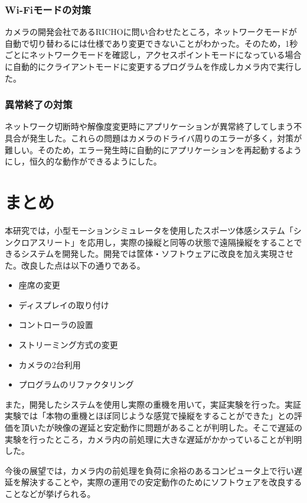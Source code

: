 \documentclass[a4paper,12pt]{jsarticle}
\begin{document}
\subsubsection{Wi-Fiモードの対策}
カメラの開発会社であるRICHOに問い合わせたところ，ネットワークモードが自動で切り替わるには仕様であり変更できないことがわかった。そのため，1秒ごとにネットワークモードを確認し，アクセスポイントモードになっている場合に自動的にクライアントモードに変更するプログラムを作成しカメラ内で実行した。

\subsubsection{異常終了の対策}
ネットワーク切断時や解像度変更時にアプリケーションが異常終了してしまう不具合が発生した。これらの問題はカメラのドライバ周りのエラーが多く，対策が難しい。そのため，エラー発生時に自動的にアプリケーションを再起動するようにし，恒久的な動作ができるようにした。

\section{まとめ}
本研究では，小型モーションシミュレータを使用したスポーツ体感システム「シンクロアスリート」を応用し，実際の操縦と同等の状態で遠隔操縦をすることできるシステムを開発した。開発では筐体・ソフトウェアに改良を加え実現させた。改良した点は以下の通りである。
\begin{itemize}
  \item 座席の変更
  \item ディスプレイの取り付け
  \item コントローラの設置
  \item ストリーミング方式の変更
  \item カメラの2台利用
  \item プログラムのリファクタリング
\end{itemize}

また，開発したシステムを使用し実際の重機を用いて，実証実験を行った。実証実験では「本物の重機とほぼ同じような感覚で操縦をすることができた」との評価を頂いたが映像の遅延と安定動作に問題があることが判明した。そこで遅延の実験を行ったところ，カメラ内の前処理に大きな遅延がかかっていることが判明した。

今後の展望では，カメラ内の前処理を負荷に余裕のあるコンピュータ上で行い遅延を解決することや，実際の運用での安定動作のためにソフトウェアを改良することなどが挙げられる。
\clearpage
\end{document}
